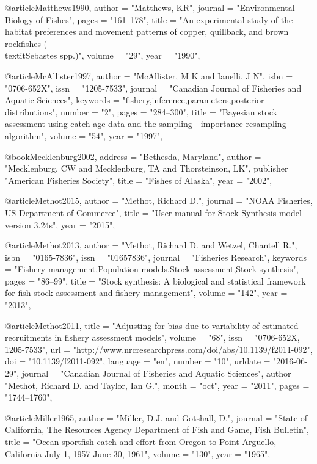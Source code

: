 @article{Matthews1990,
    author = "{Matthews, KR}",
    journal = "{Environmental Biology of Fishes}",
    pages = "{161--178}",
    title = "{{An experimental study of the habitat preferences and movement patterns of copper, quillback, and brown rockfishes (\\textit{{Sebastes}} spp.)}}",
    volume = "{29}",
    year = "{1990}",
}

@article{McAllister1997,
    author = "{McAllister, M K and Ianelli, J N}",
    isbn = "{0706-652X}",
    issn = "{1205-7533}",
    journal = "{Canadian Journal of Fisheries and Aquatic Sciences}",
    keywords = "{fishery,inference,parameters,posterior distributions}",
    number = "{2}",
    pages = "{284--300}",
    title = "{{Bayesian stock assessment using catch-age data and the sampling - importance resampling algorithm}}",
    volume = "{54}",
    year = "{1997}",
}

@book{Mecklenburg2002,
    address = "{Bethesda, Maryland}",
    author = "{Mecklenburg, CW and Mecklenburg, TA and Thorsteinson, LK}",
    publisher = "{American Fisheries Society}",
    title = "{{Fishes of Alaska}}",
    year = "{2002}",
}

@article{Methot2015,
    author = "{Methot, Richard D.}",
    journal = "{NOAA Fisheries, US Department of Commerce}",
    title = "{{User manual for Stock Synthesis model version 3.24s}}",
    year = "{2015}",
}

@article{Methot2013,
    author = "{Methot, Richard D. and Wetzel, Chantell R.}",
    isbn = "{0165-7836}",
    issn = "{01657836}",
    journal = "{Fisheries Research}",
    keywords = "{Fishery management,Population models,Stock assessment,Stock synthesis}",
    pages = "{86--99}",
    title = "{{Stock synthesis: A biological and statistical framework for fish stock assessment and fishery management}}",
    volume = "{142}",
    year = "{2013}",
}

@article{Methot2011,
    title = "{Adjusting for bias due to variability of estimated recruitments in fishery assessment models}",
    volume = "{68}",
    issn = "{0706-652X, 1205-7533}",
    url = "{http://www.nrcresearchpress.com/doi/abs/10.1139/f2011-092}",
    doi = "{10.1139/f2011-092}",
    language = "{en}",
    number = "{10}",
    urldate = "{2016-06-29}",
    journal = "{Canadian Journal of Fisheries and Aquatic Sciences}",
    author = "{Methot, Richard D. and Taylor, Ian G.}",
    month = "oct",
    year = "{2011}",
    pages = "{1744--1760}",
}

@article{Miller1965,
    author = "{Miller, D.J. and Gotshall, D.}",
    journal = "{State of California, The Resources Agency Department of Fish and Game, Fish Bulletin}",
    title = "{{Ocean sportfish catch and effort from Oregon to Point Arguello, California July 1, 1957-June 30, 1961}}",
    volume = "{130}",
    year = "{1965}",
}


